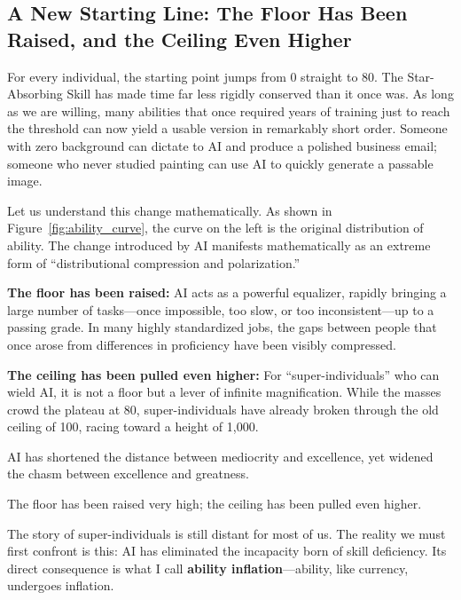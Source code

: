 \newpage

\subsection{A New Starting Line: The Floor Has Been Raised, and the Ceiling Even Higher}

For every individual, the starting point jumps from 0 straight to 80. The Star-Absorbing Skill has made time far less rigidly conserved than it once was. As long as we are willing, many abilities that once required years of training just to reach the threshold can now yield a usable version in remarkably short order. Someone with zero background can dictate to AI and produce a polished business email; someone who never studied painting can use AI to quickly generate a passable image.

\vspace{1em}

Let us understand this change mathematically. As shown in Figure~\ref{fig:ability_curve}, the curve on the left is the original distribution of ability. The change introduced by AI manifests mathematically as an extreme form of ``distributional compression and polarization.''




\textbf{The floor has been raised:} AI acts as a powerful equalizer, rapidly bringing a large number of tasks---once impossible, too slow, or too inconsistent---up to a passing grade. In many highly standardized jobs, the gaps between people that once arose from differences in proficiency have been visibly compressed.

\textbf{The ceiling has been pulled even higher:} For ``super-individuals'' who can wield AI, it is not a floor but a lever of infinite magnification. While the masses crowd the plateau at 80, super-individuals have already broken through the old ceiling of 100, racing toward a height of 1,000.

\begin{importantbox}

AI has shortened the distance between mediocrity and excellence, yet widened the chasm between excellence and greatness.

The floor has been raised very high; the ceiling has been pulled even higher.
\end{importantbox}

The story of super-individuals is still distant for most of us. The reality we must first confront is this: AI has eliminated the incapacity born of skill deficiency. Its direct consequence is what I call \textbf{ability inflation}---ability, like currency, undergoes inflation.


